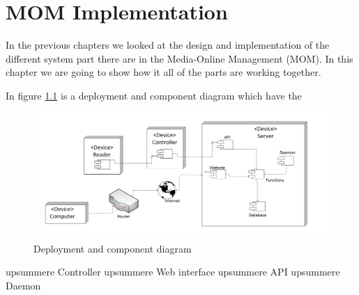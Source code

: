 \chapter{MOM Implementation}

In the previous chapters we looked at the design and implementation of the different system part there are in the Media-Online Management (MOM).
In this chapter we are going to show how it all of the parts are working together.

In figure \ref{fig:deployment} is a deployment and component diagram which have the  
\begin{figure}
	\centering
		\includegraphics[width=1.50\textwidth, angle=90 ]{images/deployment.jpg}
	\caption{Deployment and component diagram}
	\label{fig:deployment}
\end{figure}




upsummere Controller 
upsummere Web interface
upsummere API
upsummere Daemon